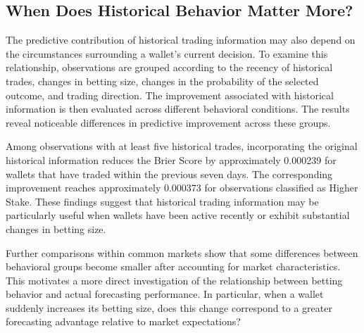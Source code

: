 \subsection{When Does Historical Behavior Matter More?}

The predictive contribution of historical trading information may also depend on the circumstances surrounding a wallet's current decision. To examine this relationship, observations are grouped according to the recency of historical trades, changes in betting size, changes in the probability of the selected outcome, and trading direction. The improvement associated with historical information is then evaluated across different behavioral conditions. The results reveal noticeable differences in predictive improvement across these groups.

Among observations with at least five historical trades, incorporating the original historical information reduces the Brier Score by approximately 0.000239 for wallets that have traded within the previous seven days. The corresponding improvement reaches approximately 0.000373 for observations classified as Higher Stake. These findings suggest that historical trading information may be particularly useful when wallets have been active recently or exhibit substantial changes in betting size.

Further comparisons within common markets show that some differences between behavioral groups become smaller after accounting for market characteristics. This motivates a more direct investigation of the relationship between betting behavior and actual forecasting performance. In particular, when a wallet suddenly increases its betting size, does this change correspond to a greater forecasting advantage relative to market expectations?

